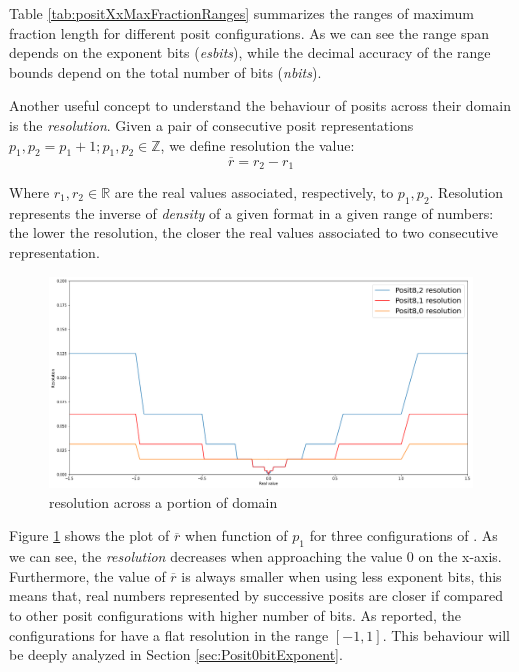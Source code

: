 Table \ref{tab:positXxMaxFractionRanges} summarizes the ranges of maximum fraction length for different posit configurations. As we can see the range span depends on the exponent bits (\textit{esbits}), while the decimal accuracy of the range bounds depend on the total number of bits (\textit{nbits}).

Another useful concept to understand the behaviour of posits across their domain is the \textit{resolution}. Given a pair of consecutive posit representations $p_1, p_2 = p_1 + 1; p_1, p_2 \in \mathbb{Z}$, we define resolution the value:
\begin{equation}\label{eqn:positResolution}
    \overline{r} = r_2 - r_1
\end{equation}

Where $r_1,r_2 \in \mathbb{R}$ are the real values associated, respectively, to $p_1, p_2$. Resolution represents the inverse of \textit{density} of a given format in a given range of numbers: the lower the resolution, the closer the real values associated to two consecutive representation.

\begin{figure}
    \centering
    \includegraphics[width=\linewidth]{img/posit8xResolutions.png}
    \caption{ resolution across a portion of domain}
    \label{fig:posit8xResolutions}
\end{figure}

Figure \ref{fig:posit8xResolutions} shows the plot of $\overline{r}$ when function of $p_1$ for three configurations of . As we can see, the \textit{resolution} decreases when approaching the value $0$ on the x-axis. Furthermore, the value of $\overline{r}$ is always smaller when using less exponent bits, this means that, real numbers represented by successive posits are closer if compared to other posit configurations with higher number of bits. As reported, the configurations for  have a flat resolution in the range $\left [ -1, 1 \right]$. This behaviour will be deeply analyzed in Section \ref{sec:Posit0bitExponent}.

